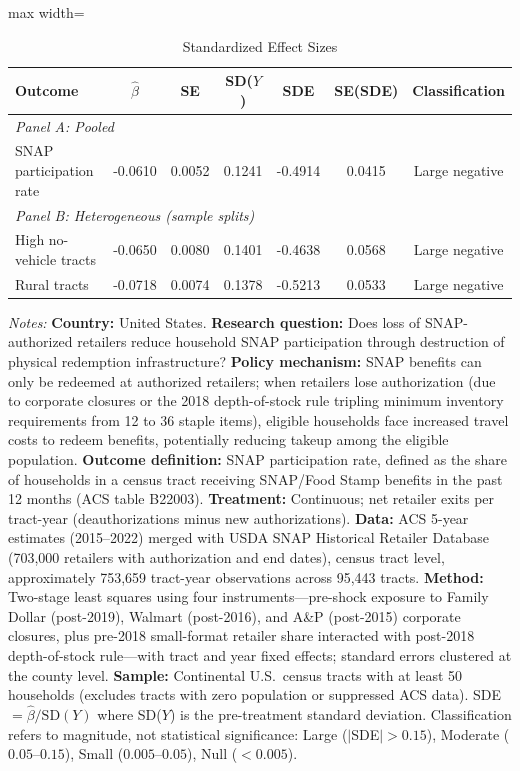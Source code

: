 \begin{table}[t]
\centering
\caption{Standardized Effect Sizes}
\label{tab:sde}
\begin{threeparttable}
\begin{adjustbox}{max width=\textwidth}
\begin{tabular}{lcccccc}
\toprule
Outcome & $\hat{\beta}$ & SE & SD($Y$) & SDE & SE(SDE) & Classification \\
\midrule
\multicolumn{7}{l}{\textit{Panel A: Pooled}} \\
\midrule
    SNAP participation rate & -0.0610 & 0.0052 & 0.1241 & -0.4914 & 0.0415 & Large negative \\
\midrule
\multicolumn{7}{l}{\textit{Panel B: Heterogeneous (sample splits)}} \\
\midrule
    High no-vehicle tracts & -0.0650 & 0.0080 & 0.1401 & -0.4638 & 0.0568 & Large negative \\
    Rural tracts & -0.0718 & 0.0074 & 0.1378 & -0.5213 & 0.0533 & Large negative \\
\bottomrule
\end{tabular}
\end{adjustbox}
\begin{tablenotes}
\small
\item \textit{Notes:} \textbf{Country:} United States. \textbf{Research question:} Does loss of SNAP-authorized retailers reduce household SNAP participation through destruction of physical redemption infrastructure? \textbf{Policy mechanism:} SNAP benefits can only be redeemed at authorized retailers; when retailers lose authorization (due to corporate closures or the 2018 depth-of-stock rule tripling minimum inventory requirements from 12 to 36 staple items), eligible households face increased travel costs to redeem benefits, potentially reducing takeup among the eligible population. \textbf{Outcome definition:} SNAP participation rate, defined as the share of households in a census tract receiving SNAP/Food Stamp benefits in the past 12 months (ACS table B22003). \textbf{Treatment:} Continuous; net retailer exits per tract-year (deauthorizations minus new authorizations). \textbf{Data:} ACS 5-year estimates (2015--2022) merged with USDA SNAP Historical Retailer Database (703,000 retailers with authorization and end dates), census tract level, approximately 753,659 tract-year observations across 95,443 tracts. \textbf{Method:} Two-stage least squares using four instruments---pre-shock exposure to Family Dollar (post-2019), Walmart (post-2016), and A\&P (post-2015) corporate closures, plus pre-2018 small-format retailer share interacted with post-2018 depth-of-stock rule---with tract and year fixed effects; standard errors clustered at the county level. \textbf{Sample:} Continental U.S.~census tracts with at least 50 households (excludes tracts with zero population or suppressed ACS data). SDE $= \hat{\beta} / \text{SD}(Y)$ where SD($Y$) is the pre-treatment standard deviation. Classification refers to magnitude, not statistical significance: Large ($|$SDE$| > 0.15$), Moderate ($0.05$--$0.15$), Small ($0.005$--$0.05$), Null ($< 0.005$).
\end{tablenotes}
\end{threeparttable}
\end{table}
